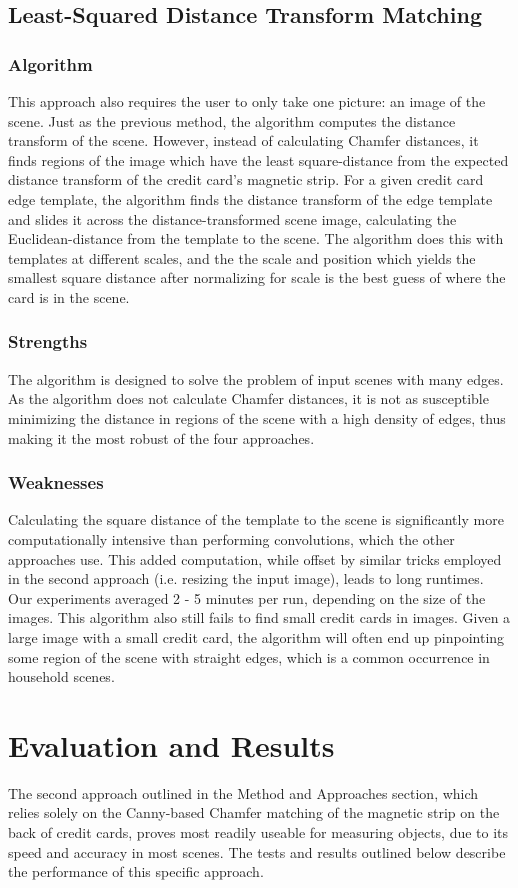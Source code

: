 \documentclass[10pt,twocolumn,letterpaper]{article}
\begin{document}
\subsection{Least-Squared Distance Transform Matching}
\subsubsection{Algorithm}
This approach also requires the user to only take one picture: an image of the scene. Just as the previous method, the algorithm computes the distance transform of the scene. However, instead of calculating Chamfer distances, it finds regions of the image which have the least square-distance from the expected distance transform of the credit card’s magnetic strip. For a given credit card edge template, the algorithm finds the distance transform of the edge template and slides it across the distance-transformed scene image, calculating the Euclidean-distance from the template to the scene. The algorithm does this with templates at different scales, and the the scale and position which yields the smallest square distance after normalizing for scale is the best guess of where the card is in the scene. 
\subsubsection{Strengths}
	The algorithm is designed to solve the problem of input scenes with many edges. As the algorithm does not calculate Chamfer distances, it is not as susceptible minimizing the distance in regions of the scene with a high density of edges, thus making it the most robust of the four approaches. 
\subsubsection{Weaknesses}
	Calculating the square distance of the template to the scene is significantly more computationally intensive than performing convolutions, which the other approaches use. This added computation, while offset by similar tricks employed in the second approach (i.e. resizing the input image), leads to long runtimes. Our experiments averaged 2 - 5 minutes per run, depending on the size of the images.
	This algorithm also still fails to find small credit cards in images. Given a large image with a small credit card, the algorithm will often end up pinpointing some region of the scene with straight edges, which is a common occurrence in household scenes. 
	
\section{Evaluation and Results}
The second approach outlined in the Method and Approaches section, which relies solely on the Canny-based Chamfer matching of the magnetic strip on the back of credit cards, proves most readily useable for measuring objects, due to its speed and accuracy in most scenes. The tests and results outlined below describe the performance of this specific approach. 
\end{document}
